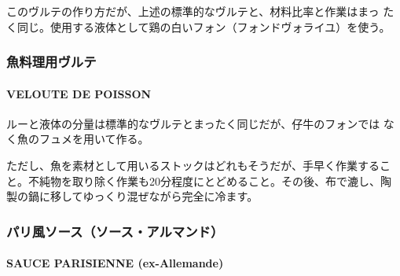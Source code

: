 このヴルテの作り方だが、上述の標準的なヴルテと、材料比率と作業はまっ
たく同じ。使用する液体として鶏の白いフォン（フォンドヴォライユ）を使う。

\maeaki

\hypertarget{ux9b5aux6599ux7406ux7528ux30f4ux30ebux30c6}{%
\subsubsection{魚料理用ヴルテ}\label{ux9b5aux6599ux7406ux7528ux30f4ux30ebux30c6}}

\hypertarget{veloute-de-poisson}{%
\paragraph{VELOUTE DE POISSON}\label{veloute-de-poisson}}


ルーと液体の分量は標準的なヴルテとまったく同じだが、仔牛のフォンでは
なく魚のフュメを用いて作る。

ただし、魚を素材として用いるストックはどれもそうだが、手早く作業するこ
と。不純物を取り除く作業も20分程度にとどめること。その後、布で漉し、陶
製の鍋に移してゆっくり混ぜながら完全に冷ます。

\maeaki

\hypertarget{ux30d1ux30eaux98a8ux30bdux30fcux30b9ux30bdux30fcux30b9ux30a2ux30ebux30deux30f3ux30c9}{%
\subsubsection{パリ風ソース（ソース・アルマンド）}\label{ux30d1ux30eaux98a8ux30bdux30fcux30b9ux30bdux30fcux30b9ux30a2ux30ebux30deux30f3ux30c9}}

\hypertarget{sauce-allemande}{%
\paragraph{SAUCE PARISIENNE (ex-Allemande)}\label{sauce-allemande}}


